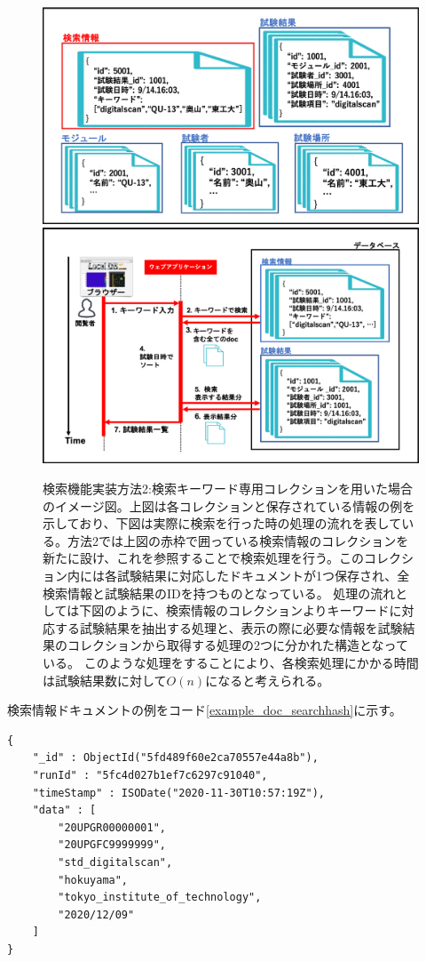 \begin{figure}[bpt]
  \begin{center}
    \includegraphics[width=12cm]{./search_mongo_collection.png}
    \includegraphics[width=12cm]{./search_mongo_collection_flow.png}
  \caption[検索機能実装方法2:検索キーワード専用コレクションを用いた場合]{検索機能実装方法2:検索キーワード専用コレクションを用いた場合のイメージ図。上図は各コレクションと保存されている情報の例を示しており、下図は実際に検索を行った時の処理の流れを表している。方法2では上図の赤枠で囲っている検索情報のコレクションを新たに設け、これを参照することで検索処理を行う。このコレクション内には各試験結果に対応したドキュメントが1つ保存され、全検索情報と試験結果のIDを持つものとなっている。
処理の流れとしては下図のように、検索情報のコレクションよりキーワードに対応する試験結果を抽出する処理と、表示の際に必要な情報を試験結果のコレクションから取得する処理の2つに分かれた構造となっている。
このような処理をすることにより、各検索処理にかかる時間は試験結果数に対して$O(n)$になると考えられる。}
  \label{search_mongo_collection}
  \end{center}
\end{figure}

検索情報ドキュメントの例をコード\ref{example_doc_searchhash}に示す。
\begin{lstlisting}[basicstyle=\scriptsize,caption=検索情報コレクションに入るドキュメントの例。このように試験結果のID、試験日時、検索対象となる名前情報が保存される。,label=example_doc_searchhash]
{
	"_id" : ObjectId("5fd489f60e2ca70557e44a8b"),
	"runId" : "5fc4d027b1ef7c6297c91040",
	"timeStamp" : ISODate("2020-11-30T10:57:19Z"),
	"data" : [
		"20UPGR00000001",
		"20UPGFC9999999",
		"std_digitalscan",
		"hokuyama",
		"tokyo_institute_of_technology",
		"2020/12/09"
	]
}
\end{lstlisting}

